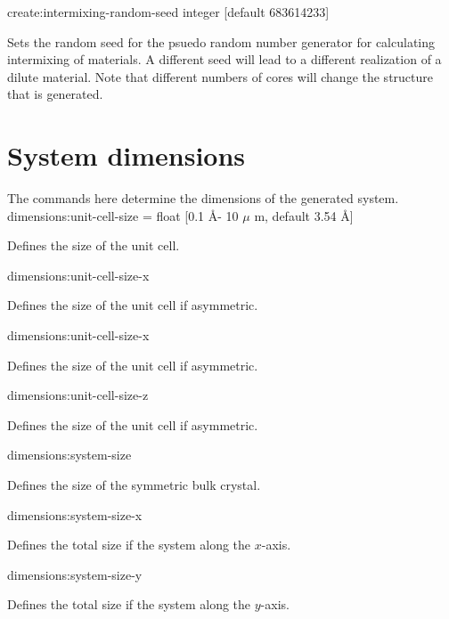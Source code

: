 {\zicf create:intermixing-random-seed integer [default 683614233]}
Sets the random seed for the psuedo random number generator for calculating
intermixing of materials. A different seed will lead to a different realization
of a dilute material. Note that different numbers of cores will change the
structure that is generated.\\

\section*{System dimensions}
The commands here determine the dimensions of the generated system.\\

{\zicf dimensions:unit-cell-size = float [0.1 \AA - 10 $\mu$ m, default 3.54 \AA]} Defines the size of the unit cell.\\ \par

{\zicf dimensions:unit-cell-size-x} Defines the size of the unit cell if asymmetric.\\ \par

{\zicf dimensions:unit-cell-size-x} Defines the size of the unit cell if asymmetric.\\ \par

{\zicf dimensions:unit-cell-size-z} Defines the size of the unit cell if asymmetric.\\ \par

{\zicf dimensions:system-size} Defines the size of the symmetric bulk crystal. \\ \par

{\zicf dimensions:system-size-x} Defines the total size if the system along the $x$-axis.\\ \par

{\zicf dimensions:system-size-y} Defines the total size if the system along the $y$-axis.\\ \par

